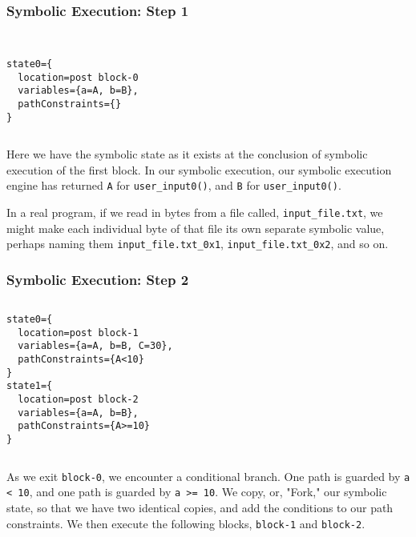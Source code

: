 \documentclass{beamer}
\def\code#1{\scriptsize{\texttt{#1}}}
\begin{document}
\begin{frame}[fragile]
\frametitle{Symbolic Execution: Step 1}
\begin{columns}
  \begin{lstlisting}[basicstyle=\tiny]

state0={
  location=post block-0
  variables={a=A, b=B},
  pathConstraints={}
}
  \end{lstlisting}
\end{columns}
Here we have the symbolic state as it exists at the conclusion of symbolic execution of the first block. In our symbolic execution, our symbolic execution engine has returned \texttt{A} for \texttt{user\_input0()}, and \texttt{B} for \texttt{user\_input0()}.
\par
In a real program, if we read in bytes from a file called, \texttt{input\_file.txt}, we might make each individual byte of that file its own separate symbolic value, perhaps naming them \texttt{input\_file.txt\_0x1}, \texttt{input\_file.txt\_0x2}, and so on.
\end{frame}

\begin{frame}[fragile]
\frametitle{Symbolic Execution: Step 2}
\begin{columns}
  \begin{lstlisting}[basicstyle=\tiny]
state0={
  location=post block-1
  variables={a=A, b=B, C=30},
  pathConstraints={A<10}
}
state1={
  location=post block-2
  variables={a=A, b=B},
  pathConstraints={A>=10}
}
  \end{lstlisting}
\end{columns}
As we exit \texttt{block-0}, we encounter a conditional branch. One path is guarded by \texttt{a < 10}, and one path is guarded by \texttt{a >= 10}. We copy, or, "Fork," our symbolic state, so that we have two identical copies, and add the conditions to our path constraints. We then execute the following blocks, \texttt{block-1} and \texttt{block-2}.
\end{frame}
\end{document}
